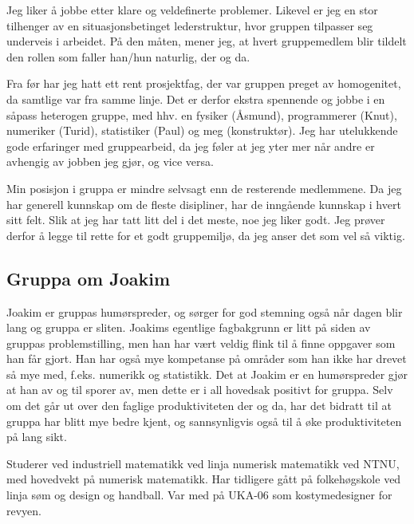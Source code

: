 Jeg liker å jobbe etter klare og veldefinerte problemer. Likevel
er jeg en stor tilhenger av en situasjonsbetinget lederstruktur, hvor gruppen
tilpasser seg underveis i arbeidet. På den måten, mener jeg, at hvert
gruppemedlem blir tildelt den rollen som faller han/hun naturlig, der og da. 

Fra før har jeg hatt ett rent prosjektfag, der var gruppen preget av
homogenitet, da samtlige var fra samme linje. Det er derfor ekstra spennende og
jobbe i en såpass heterogen gruppe, med hhv. en fysiker (Åsmund), programmerer
(Knut), numeriker (Turid), statistiker (Paul) og meg (konstruktør). Jeg har
utelukkende gode erfaringer med gruppearbeid, da jeg føler at jeg yter mer når
andre er avhengig av jobben jeg gjør, og vice versa.

Min posisjon i gruppa er mindre selvsagt enn de resterende medlemmene. Da jeg har generell
kunnskap om de fleste disipliner, har de inngående kunnskap i hvert sitt felt.
Slik at jeg har tatt litt del i det meste, noe jeg liker godt. Jeg prøver derfor
å legge til rette for et godt gruppemiljø, da jeg anser det som vel så viktig.

\subsection*{Gruppa om Joakim}
Joakim er gruppas humørspreder, og sørger for god stemning også når dagen blir
lang og gruppa er sliten. Joakims egentlige fagbakgrunn er litt på siden av
gruppas problemstilling, men han har vært veldig flink til å finne oppgaver som
han får gjort. Han har også mye kompetanse på områder som han ikke har drevet så
mye med, f.eks. numerikk og statistikk. Det at Joakim er en humørspreder gjør at 
han av og til sporer av, men dette er i all hovedsak positivt for gruppa. Selv om 
det går ut over den faglige produktiviteten der og da, har det bidratt til at 
gruppa har blitt mye bedre kjent, og sannsynligvis også til å øke produktiviteten 
på lang sikt.

Studerer ved industriell matematikk ved linja numerisk matematikk ved NTNU, med hovedvekt på numerisk matematikk. Har tidligere gått på folkehøgskole ved linja søm og design og handball. Var med på UKA-06 som kostymedesigner for revyen.

